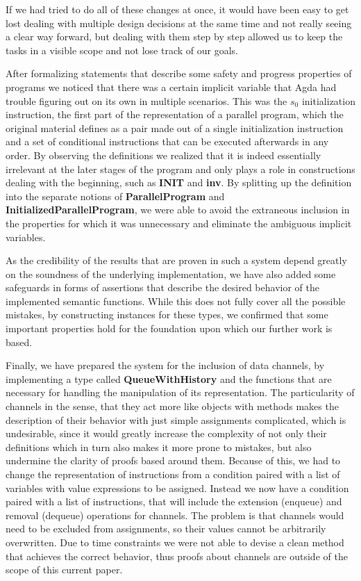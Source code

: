 
If we had tried to do all of these changes at once, it would have been easy to get lost dealing with multiple design decisions at the same time and not really seeing a clear way forward, but dealing with them step by step allowed us to keep the tasks in a visible scope and not lose track of our goals.

After formalizing statements that describe some safety and progress properties of programs we noticed that there was a certain implicit variable that Agda had trouble figuring out on its own in multiple scenarios. This was the $s_0$ initialization instruction, the first part of the representation of a parallel program, which the original material defines as a pair made out of a single initialization instruction and a set of conditional instructions that can be executed afterwards in any order. By observing the definitions we realized that it is indeed essentially irrelevant at the later stages of the program and only plays a role in constructions dealing with the beginning, such as \textbf{INIT} and \textbf{inv}. By splitting up the definition into the separate notions of \textbf{ParallelProgram} and \textbf{InitializedParallelProgram}, we were able to avoid the extraneous inclusion in the properties for which it was unnecessary and eliminate the ambiguous implicit variables.

As the credibility of the results that are proven in such a system depend greatly on the soundness of the underlying implementation, we have also added some safeguards in forms of assertions that describe the desired behavior of the implemented semantic functions. While this does not fully cover all the possible mistakes, by constructing instances for these types, we confirmed that some important properties hold for the foundation upon which our further work is based.

Finally, we have prepared the system for the inclusion of data channels, by implementing a type called \textbf{QueueWithHistory} and the functions that are necessary for handling the manipulation of its representation. The particularity of channels in the sense, that they act more like objects with methods makes the description of their behavior with just simple assignments complicated, which is undesirable, since it would greatly increase the complexity of not only their definitions which in turn also makes it more prone to mistakes, but also undermine the clarity of proofs based around them. Because of this, we had to change the representation of instructions from a condition paired with a list of variables with value expressions to be assigned. Instead we now have a condition paired with a list of instructions, that will include the extension (enqueue) and removal (dequeue) operations for channels. The problem is that channels would need to be excluded from assignments, so their values cannot be arbitrarily overwritten. Due to time constraints we were not able to devise a clean method that achieves the correct behavior, thus proofs about channels are outside of the scope of this current paper.

